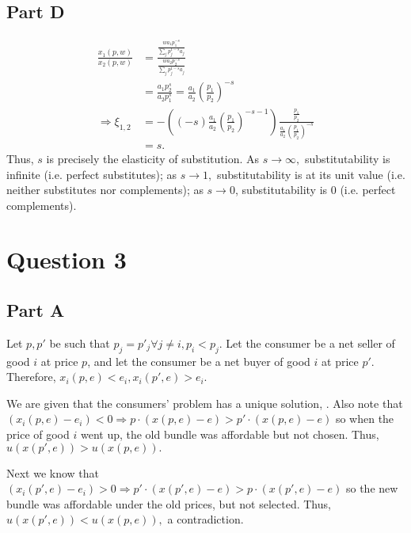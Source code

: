 \documentclass[11pt]{article} %
\begin{document}
\subsection{Part D}
\begin{align*}
\frac{x_1(p,w)}{x_2(p,w)} &= \frac{ \frac{w a_1 p_1^{-s}}{\sum_j p_j^{1-s}a_j}}{ \frac{w a_2 p_2^{-s}}{\sum_j p_j^{1-s}a_j}} \\
&=\frac{a_1p_2^s}{a_2p_1^s} = \frac{a_1}{a_2}\left( \frac{p_1}{p_2}\right)^{-s}\\
\Rightarrow \xi_{1,2} &=  -\left((-s) \frac{a_1}{a_2}  \left( \frac{p_1}{p_2}\right)^{-s-1}\right) \frac{\frac{p_1}{p_2}}{ \frac{a_1}{a_2}\left( \frac{p_1}{p_2}\right)^{-s}}\\
&= s.
\end{align*}
Thus, $s$ is precisely the elasticity of substitution. As $s\rightarrow \infty,$ substitutability is infinite (i.e. perfect substitutes); as $s\rightarrow 1,$ substitutability is at its unit value (i.e. neither substitutes nor complements); as $s\rightarrow 0$, substitutability is $0$ (i.e. perfect complements).

\section{Question 3}
\subsection{Part A}
Let $p,p'$ be such that $p_j = p'_j \forall j\neq i, p_i<p_j.$ Let the consumer be a net seller of good $i$ at price $p$, and let the consumer be a net buyer of good $i$ at price $p'$. Therefore, $x_i(p,e)<e_i, x_i(p',e)>e_i.$

We are given that the consumers' problem has a unique solution, . Also note that $ (x_i(p,e) - e_i)<0 \Rightarrow p\cdot (x(p,e)-e) > p'\cdot (x(p,e)-e) $ so when the price of good $i$ went up, the old bundle was affordable but not chosen. Thus, $u(x(p',e))>u(x(p,e)).$

Next we know that $ (x_i(p',e) - e_i)>0 \Rightarrow  p' \cdot (x(p',e)-e) > p \cdot (x(p',e)-e) $ so the new bundle was affordable under the old prices, but not selected. Thus, $u(x(p',e))<u(x(p,e)),$ a contradiction.
\end{document}
